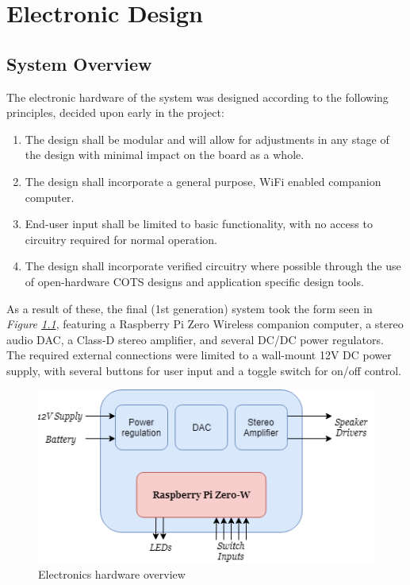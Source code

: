 \documentclass[main.tex]{subfiles}
\begin{document}
\chapter{Electronic Design}
\section{System Overview}

The electronic hardware of the system was designed according to the following principles, decided upon early in the project:
\begin{enumerate}
    \item The design shall be modular and will allow for adjustments in any stage of the design with minimal impact on the board as a whole.
    \item The design shall incorporate a general purpose, WiFi enabled companion computer.
    \item End-user input shall be limited to basic functionality, with no access to circuitry required for normal operation.
    \item The design shall incorporate verified circuitry where possible through the use of open-hardware COTS designs and application specific design tools.
\end{enumerate}
As a result of these, the final (1st generation) system took the form seen in \textit{Figure \ref{fig:electronics-system}}, featuring a Raspberry Pi Zero Wireless companion computer, a stereo audio DAC, a Class-D stereo amplifier, and several DC/DC power regulators. The required external connections were limited to a wall-mount 12V DC power supply, with several buttons for user input and a toggle switch for on/off control.

\begin{figure}[H]
    \centering
    \includegraphics[scale=0.75]{./figs/electronics-system.png}        
    \caption{Electronics hardware overview}
    \label{fig:electronics-system}
\end{figure}
\end{document}
